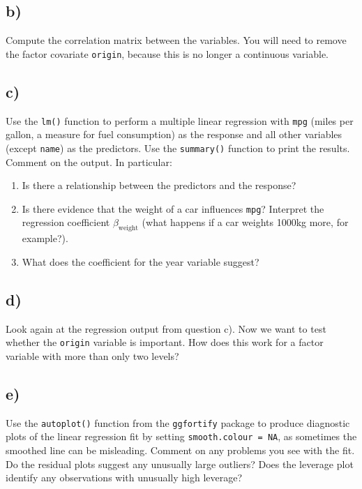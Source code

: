 \documentclass[]{article}
\begin{document}
\hypertarget{b}{%
\subsection{b)}\label{b}}

Compute the correlation matrix between the variables. You will need to
remove the factor covariate \texttt{origin}, because this is no longer a
continuous variable.

\hypertarget{c}{%
\subsection{c)}\label{c}}

Use the \texttt{lm()} function to perform a multiple linear regression
with \texttt{mpg} (miles per gallon, a measure for fuel consumption) as
the response and all other variables (except \texttt{name}) as the
predictors. Use the \texttt{summary()} function to print the results.
Comment on the output. In particular:

\begin{enumerate}
\def\labelenumi{\roman{enumi}.}
\item
  Is there a relationship between the predictors and the response?
\item
  Is there evidence that the weight of a car influences \texttt{mpg}?
  Interpret the regression coefficient \(\beta_{\text{weight}}\) (what
  happens if a car weights 1000kg more, for example?).
\item
  What does the coefficient for the year variable suggest?
\end{enumerate}

\hypertarget{d}{%
\subsection{d)}\label{d}}

Look again at the regression output from question c). Now we want to
test whether the \texttt{origin} variable is important. How does this
work for a factor variable with more than only two levels?

\hypertarget{e}{%
\subsection{e)}\label{e}}

Use the \texttt{autoplot()} function from the \texttt{ggfortify} package
to produce diagnostic plots of the linear regression fit by setting
\texttt{smooth.colour\ =\ NA}, as sometimes the smoothed line can be
misleading. Comment on any problems you see with the fit. Do the
residual plots suggest any unusually large outliers? Does the leverage
plot identify any observations with unusually high leverage?
\end{document}

